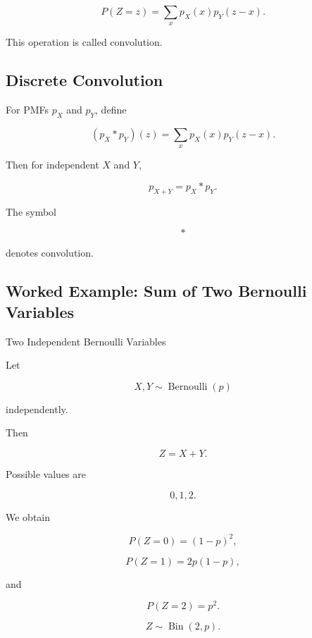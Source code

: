 \[
\boxed{
P(Z=z)
=
\sum_x
p_X(x)p_Y(z-x).
}
\]

This operation is called convolution.

\subsection{Discrete Convolution}
\label{subsec:discrete-convolution}

For PMFs \(p_X\) and \(p_Y\), define

\[
\boxed{
(p_X*p_Y)(z)
=
\sum_x
p_X(x)p_Y(z-x).
}
\]

Then for independent \(X\) and \(Y\),

\[
\boxed{
p_{X+Y}
=
p_X*p_Y.
}
\]

The symbol

\[
*
\]

denotes convolution.

\subsection{Worked Example: Sum of Two Bernoulli Variables}
\label{subsec:worked-sum-bernoulli}

\begin{workedexamplebox}{Two Independent Bernoulli Variables}

Let

\[
X,Y
\sim
\operatorname{Bernoulli}(p)
\]

independently.

Then

\[
Z=X+Y.
\]

Possible values are

\[
0,1,2.
\]

We obtain

\[
P(Z=0)
=
(1-p)^2,
\]

\[
P(Z=1)
=
2p(1-p),
\]

and

\[
P(Z=2)
=
p^2.
\]

\begin{answerbox}
\[
\boxed{
Z
\sim
\operatorname{Bin}(2,p).
}
\]
\end{answerbox}

\end{workedexamplebox}

